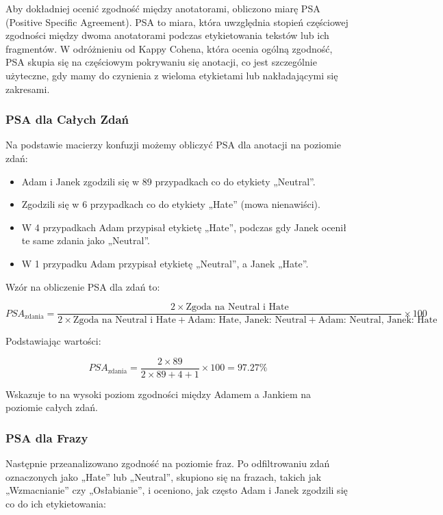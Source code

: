 \documentclass[12pt]{article}
\begin{document}
Aby dokładniej ocenić zgodność między anotatorami, obliczono miarę PSA (Positive Specific Agreement). PSA to miara, która uwzględnia stopień częściowej zgodności między dwoma anotatorami podczas etykietowania tekstów lub ich fragmentów. W odróżnieniu od Kappy Cohena, która ocenia ogólną zgodność, PSA skupia się na częściowym pokrywaniu się anotacji, co jest szczególnie użyteczne, gdy mamy do czynienia z wieloma etykietami lub nakładającymi się zakresami.

\subsubsection{PSA dla Całych Zdań}

Na podstawie macierzy konfuzji możemy obliczyć PSA dla anotacji na poziomie zdań:

\begin{itemize}
    \item Adam i Janek zgodzili się w 89 przypadkach co do etykiety „Neutral”.
    \item Zgodzili się w 6 przypadkach co do etykiety „Hate” (mowa nienawiści).
    \item W 4 przypadkach Adam przypisał etykietę „Hate”, podczas gdy Janek ocenił te same zdania jako „Neutral”.
    \item W 1 przypadku Adam przypisał etykietę „Neutral”, a Janek „Hate”.
\end{itemize}

Wzór na obliczenie PSA dla zdań to:

\begin{dmath}
PSA_{\text{zdania}} = \frac{2 \times \text{Zgoda na Neutral i Hate}}{2 \times \text{Zgoda na Neutral i Hate} + \text{Adam: Hate, Janek: Neutral} + \text{Adam: Neutral, Janek: Hate}} \times 100
\end{dmath}

Podstawiając wartości:

\begin{dmath}
PSA_{\text{zdania}} = \frac{2 \times 89}{2 \times 89 + 4 + 1} \times 100 = 97.27\%
\end{dmath}

Wskazuje to na wysoki poziom zgodności między Adamem a Jankiem na poziomie całych zdań.

\subsubsection{PSA dla Frazy}

Następnie przeanalizowano zgodność na poziomie fraz. Po odfiltrowaniu zdań oznaczonych jako „Hate” lub „Neutral”, skupiono się na frazach, takich jak „Wzmacnianie” czy „Osłabianie”, i oceniono, jak często Adam i Janek zgodzili się co do ich etykietowania:
\end{document}
